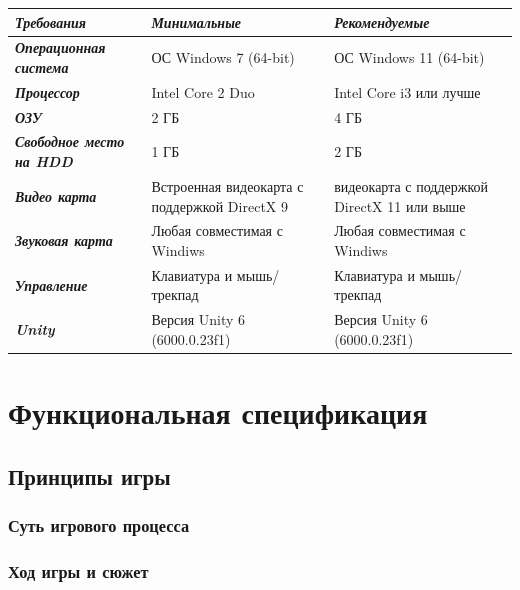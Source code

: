 \documentclass{article}
\begin{document}
\begin{center}
    \begin{tabular}{|p{4cm}|p{4cm}|p{6cm}|}
    \hline
      \textit{\textbf {Требования}}   & \textit{\textbf {Минимальные}}  & \textit{\textbf {Рекомендуемые}}  \\
      [0.5ex]
      \hline 
        \textit{\textbf {Операционная система}} & ОС Windows 7 (64-bit) & ОС Windows 11 (64-bit)\\
        \hline 
         \textit{\textbf {Процессор}} & Intel Core 2 Duo & Intel Core i3 или лучше\\
         \hline
         \textit{\textbf {ОЗУ}} & 2 ГБ & 4 ГБ\\
         \hline
         \textit{\textbf {Свободное место на HDD}} & 1 ГБ& 2 ГБ\\
         \hline
         \textit{\textbf {Видео карта}} & Встроенная видеокарта с поддержкой DirectX 9 & видеокарта с поддержкой DirectX 11 или выше\\
         \hline
         \textit{\textbf {Звуковая карта}} & Любая совместимая с Windiws & Любая совместимая с Windiws\\
         \hline
         \textit{\textbf {Управление}} & Клавиатура и мышь/трекпад & Клавиатура и мышь/трекпад\\ 
         \hline  
         \textit{\textbf {Unity}} & Версия Unity 6 (6000.0.23f1) &Версия Unity 6 (6000.0.23f1)\\ [1ex]
         \hline  
    \end{tabular}
\end{center}

\newpage
\section{Функциональная спецификация}

\subsection{Принципы игры}

\subsubsection{Суть игрового процесса}

\subsubsection{Ход игры и сюжет}
\end{document}
